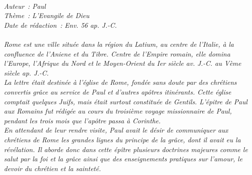 \BFont
\noindent\hrulefill
{\footnotesize
\textit{
\bigskip
{\centering{}
\\Auteur~: Paul
\\Thème~: L'Evangile de Dieu
\\Date de rédaction~: Env. 56 ap. J.-C.\\}
}
\textit{
\\Rome est une ville située dans la région du Latium, au centre de l'Italie, à la confluence de l'Aniene et du Tibre. Centre de l'Empire romain, elle domina l'Europe, l'Afrique du Nord et le Moyen-Orient du Ier siècle av. J.-C. au Vème siècle ap. J.-C.
\\La lettre était destinée à l'église de Rome, fondée sans doute par des chrétiens convertis grâce au service de Paul et d'autres apôtres itinérants. Cette église comptait quelques Juifs, mais était surtout constituée de Gentils. L'épitre de Paul aux Romains fut rédigée au cours du troisième voyage missionnaire de Paul, pendant les trois mois que l'apôtre passa à Corinthe.
\\En attendant de leur rendre visite, Paul avait le désir de communiquer aux chrétiens de Rome les grandes lignes du principe de la grâce, dont il avait eu la révélation. Il aborde donc dans cette épître plusieurs doctrines majeures comme le salut par la foi et la grâce ainsi que des enseignements pratiques sur l'amour, le devoir du chrétien et la sainteté.\bigskip
}
}
\par\nobreak\noindent\hrulefill
